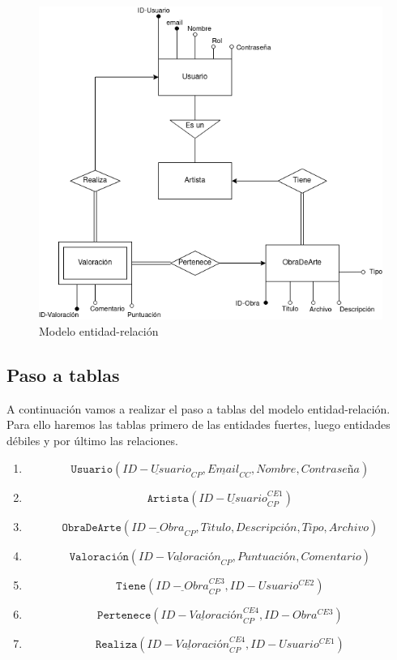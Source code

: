 \begin{figure}[H]
  \centering
  \includegraphics[width=\textwidth]{diagramas/e-r}
  \caption{Modelo entidad-relación}
  \label{fig:e-r}
\end{figure}

\subsection{Paso a tablas}
A continuación vamos a realizar el paso a tablas del modelo entidad-relación. Para
ello haremos las tablas primero de las entidades fuertes, luego entidades débiles
y por último las relaciones.

\begin{enumerate}
    \item \[ \texttt{Usuario}(\underline{ID-Usuario}_{CP}, \underline{Email}_{CC}, Nombre, Contraseña) \]
    \item \[ \texttt{Artista}(\underline{ID-Usuario}_{CP}^{CE1}) \]
    \item \[ \texttt{ObraDeArte}(\underline{ID-Obra}_{CP}, Titulo, Descripción, Tipo, Archivo) \]
    \item \[ \texttt{Valoración}(\underline{ID-Valoración}_{CP}, Puntuación, Comentario) \]
    \item \[ \texttt{Tiene}(\underline{ID-Obra}_{CP}^{CE3}, ID-Usuario^{CE2}) \]
    \item \[ \texttt{Pertenece}(\underline{ID-Valoración}_{CP}^{CE4}, ID-Obra^{CE3}) \]
    \item \[ \texttt{Realiza}(\underline{ID-Valoración}_{CP}^{CE4}, ID-Usuario^{CE1}) \]
\end{enumerate}

